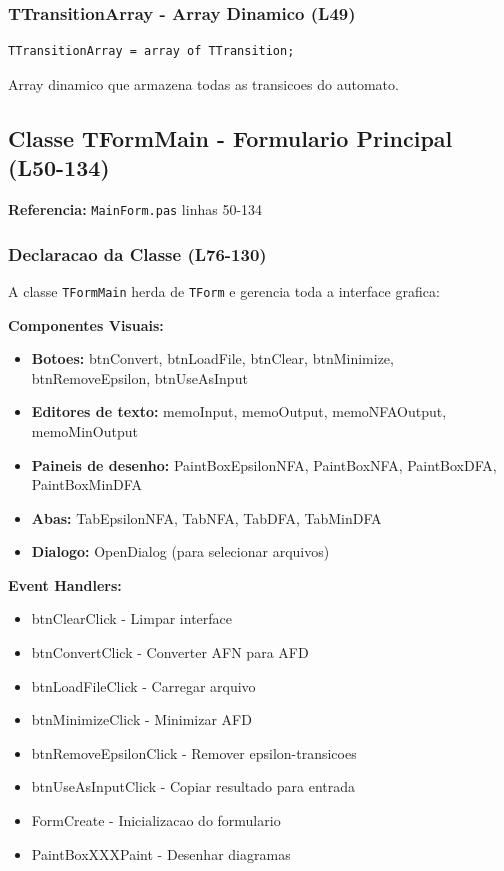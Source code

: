 \documentclass[12pt,a4paper]{article}
\begin{document}
\subsubsection{TTransitionArray - Array Dinamico (L49)}

\begin{lstlisting}[style=pascal]
TTransitionArray = array of TTransition;
\end{lstlisting}

Array dinamico que armazena todas as transicoes do automato.

\subsection{Classe TFormMain - Formulario Principal (L50-134)}

\textbf{Referencia:} \texttt{MainForm.pas} linhas 50-134

\subsubsection{Declaracao da Classe (L76-130)}

A classe \texttt{TFormMain} herda de \texttt{TForm} e gerencia toda a interface grafica:

\textbf{Componentes Visuais:}
\begin{itemize}
    \item \textbf{Botoes:} btnConvert, btnLoadFile, btnClear, btnMinimize, btnRemoveEpsilon, btnUseAsInput
    \item \textbf{Editores de texto:} memoInput, memoOutput, memoNFAOutput, memoMinOutput
    \item \textbf{Paineis de desenho:} PaintBoxEpsilonNFA, PaintBoxNFA, PaintBoxDFA, PaintBoxMinDFA
    \item \textbf{Abas:} TabEpsilonNFA, TabNFA, TabDFA, TabMinDFA
    \item \textbf{Dialogo:} OpenDialog (para selecionar arquivos)
\end{itemize}

\textbf{Event Handlers:}
\begin{itemize}
    \item btnClearClick - Limpar interface
    \item btnConvertClick - Converter AFN para AFD
    \item btnLoadFileClick - Carregar arquivo
    \item btnMinimizeClick - Minimizar AFD
    \item btnRemoveEpsilonClick - Remover epsilon-transicoes
    \item btnUseAsInputClick - Copiar resultado para entrada
    \item FormCreate - Inicializacao do formulario
    \item PaintBoxXXXPaint - Desenhar diagramas
\end{itemize}
\end{document}
